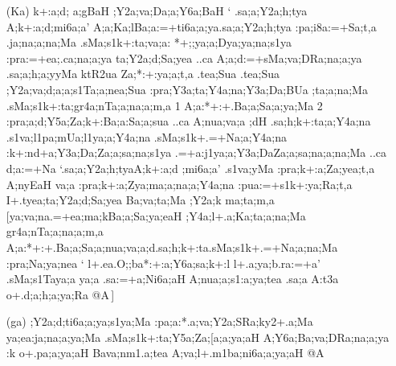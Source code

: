 \begin{spacing}{1.15}
\begin{itemize}
\begin{itemize}
 \item[({\sktf Ka})] {\sktf k+:a;d;%
a;gBaH ;Y2a;va;Da;a;Y6a;BaH} `{\sktf
.sa;a;Y2a;h;tya \ZF{-} A;k+:a;d;mi6a;a}' {\sktf
\ZF{(}A;a;Ka;l\ZF{-}Ba;a:=+ti6a;a;ya\ZF{-}.sa;a;Y2a;h;tya%
\ZF{-}:pa;i8a:=+Sa;t,a\ZF{)} .ja;na;a;na;Ma} {\sktf .sMa;s1k+:ta;va;a:%
*+;;ya;a;Dya;ya;na;s1ya} {\sktf
:pra:=+ea;.ca;na;a;ya\ZF{,} ta;Y2a;d;Sa;yea ..ca
A;a;d:=+sMa;va;DRa;na;a;ya\ZF{,} .sa;a;h;a;yyMa} {\sktf ktR2ua Za;*:+:ya;a;t,a  .tea;Sua
.tea;Sua ;Y2a;va;d;a;a;s1Ta;a;nea;Sua :pra;Y3a;ta;Y4a;na;Y3a;Da;BUa%
;ta;a;na;Ma .sMa;s1k+:ta;gr4a;nTa;a;na;a;m,a \ZF{(}1\ZF{)}
A;a:*+:+.Ba;a;Sa;a;ya;Ma \ZF{(}2\ZF{)}
:pra;a{;d};Y5a;Za;k+:Ba;a}{\sktf :Sa;a;sua} {\sktf ..ca A;nua;va;a}{\sktf
;dH} {\sktf .sa;h;k+:ta;a;Y4a;na
.s1va;l1pa;mUa;l1ya;a;Y4a;na .sMa;s1k+.=+Na;a;Y4a;na
:k+:nd+a;Y3a;Da;Za;a;sa;na;s1ya} {\sktf .=+a:j1ya;a;Y3a;Da}{\sktf Za;a;sa;na;a;na;Ma} {\sktf ..ca
d;a:=+Na}  `{\sktf .sa;a;Y2a;h;tya\ZF{-}A;k+:a;d%
;mi6a;a}' {\sktf .s1va;yMa :pra;k+:a;Za;yea;t,a A;nyEaH va;a :pra;k+:a;Zya;ma;a;na;a;Y4a;na :pua:=+s1k+:ya;Ra;t,a\ZF{,}
I+.tyea;ta;Y2a;d;Sa;yea Ba;va;ta;Ma ;Y2a;k ma;ta;m,a}
[{\sktf ya;va;na\ZF{-}.=+ea;ma;k\ZF{-}Ba;a;Sa;ya;eaH
;Y4a;l+.a;Ka;ta;a;na;Ma gr4a;nTa;a;na;a;m,a {A;a:*+:}+.Ba;a;Sa;a;nua;va;a;d\ZF{-}.sa;h;k+:ta\ZF{-}.sMa;s1k+.=+Na;a;na;Ma :pra;Na;ya;nea\ZF{,}} `{\sktf
l+.ea.O;;ba\ZF{-}{\break}*:+:a;Y6a;sa;k+:l%
\ZF{-}l+.a;ya;b.ra:=+a}' {\sktf .sMa{;s1Ta}ya;a ya;a .sa:=+a;Ni6a;aH A;nua;a;s1:a;ya;tea%
\ZF{,} .sa;a A:t3a o+.d;a;h;a;ya;Ra @A}\,]
                      
\item[({\sktf ga})] {\sktf ;Y2a;d;ti6a;a;ya;s1ya;Ma
:pa;a:*.a;va;Y2a;SRa;ky2+.a;Ma ya;ea:ja;na;a;ya;Ma
.sMa;s1k+:ta;Y5a;Za;[a;a;ya;aH
A;Y6a;Ba;va;DRa;na;a;ya :k o+.pa;a;ya;aH Ba{va};nm1.a;tea A;va;l+.m1ba;ni6a;a;ya;aH @A}
 \end{itemize} 
\end{itemize}
\end{spacing}

